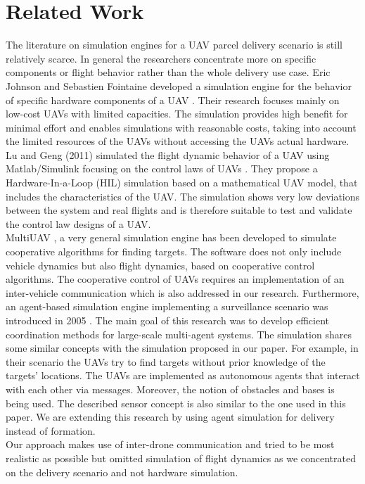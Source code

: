 \section{Related Work}
The literature on simulation engines for a UAV parcel delivery scenario is still relatively scarce. In general the researchers concentrate more on specific components or flight behavior rather than the whole delivery use case. Eric Johnson and Sebastien Fointaine developed a simulation engine for the behavior of specific hardware components of a UAV \cite{johnson.2001}. Their research focuses mainly on low-cost UAVs with limited capacities. The simulation provides high benefit for minimal effort and enables simulations with reasonable costs, taking into account the limited resources of the UAVs without accessing the UAVs actual hardware. Lu and Geng (2011) simulated the flight dynamic behavior of a UAV using Matlab/Simulink focusing on the control laws of UAVs \cite{lu.2011}. They propose a Hardware-In-a-Loop (HIL) simulation based on a mathematical UAV model, that includes the characteristics of the UAV. The simulation shows very low deviations between the system and real flights and is therefore suitable to test and validate the control law designs of a UAV. \\
MultiUAV \cite{rasmussen.2003}, a very general simulation engine has been developed to simulate cooperative algorithms for finding targets. The software does not only include vehicle dynamics but also flight dynamics, based on cooperative control algorithms. The cooperative control of UAVs requires an implementation of an inter-vehicle communication which is also addressed in our research. Furthermore, an agent-based simulation engine implementing a surveillance scenario was introduced in 2005 \cite{jang.2005}. The main goal of this research was to develop efficient coordination methods for large-scale multi-agent systems. The simulation shares some similar concepts with the simulation proposed in our paper. For example, in their scenario the UAVs try to find targets without prior knowledge of the targets’ locations. The UAVs are implemented as autonomous agents that interact with each other via messages. Moreover, the notion of obstacles and bases is being used. The described sensor concept is also similar to the one used in this paper. We are extending this research by using agent simulation for delivery instead of formation.\\
Our approach makes use of inter-drone communication and tried to be most realistic as possible but omitted simulation of flight dynamics as we concentrated on the delivery scenario and not hardware simulation. 

